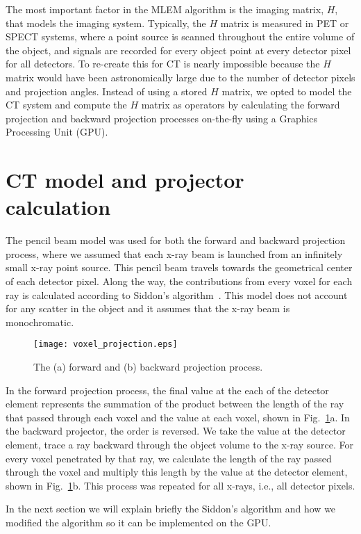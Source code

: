 The most important factor in the MLEM algorithm is the imaging matrix, $H$, that models the imaging system.  Typically, the $H$ matrix is measured in PET or SPECT systems, where a point source is scanned throughout the entire volume of the object, and signals are recorded for every object point at every detector pixel for all detectors.  To re-create this for CT is nearly impossible because the $H$ matrix would have been astronomically large due to the number of detector pixels and projection angles.  Instead of using a stored $H$ matrix, we opted to model the CT system and compute the $H$ matrix as operators by calculating the forward projection and backward projection processes on-the-fly using a Graphics Processing Unit (GPU).

\section{CT model and projector calculation}
The pencil beam model was used for both the forward and backward projection process, where we assumed that each x-ray beam is launched from an infinitely small x-ray point source. This pencil beam travels towards the geometrical center of each detector pixel.  Along the way, the contributions from every voxel for each ray is calculated according to Siddon's algorithm~\cite{Siddon1985}.  This model does not account for any scatter in the object and it assumes that the x-ray beam is monochromatic.
%
\begin{figure}[h]
\centering
\texttt{[image: voxel\_projection.eps]}
\caption{The (a) forward and (b) backward projection process.}
\label{fig:voxel_projection}
\end{figure}

In the forward projection process, the final value at the each of the detector element represents the summation of the product between the length of the ray that passed through each voxel and the value at each voxel, shown in Fig.~\ref{fig:voxel_projection}a.  In the backward projector, the order is reversed. We take the value at the detector element, trace a ray backward through the object volume to the x-ray source.  For every voxel penetrated by that ray, we calculate the length of the ray passed through the voxel and multiply this length by the value at the detector element, shown in Fig.~\ref{fig:voxel_projection}b.  This process was repeated for all x-rays, i.e., all detector pixels.

In the next section we will explain briefly the Siddon's algorithm and how we modified the algorithm so it can be implemented on the GPU. 

